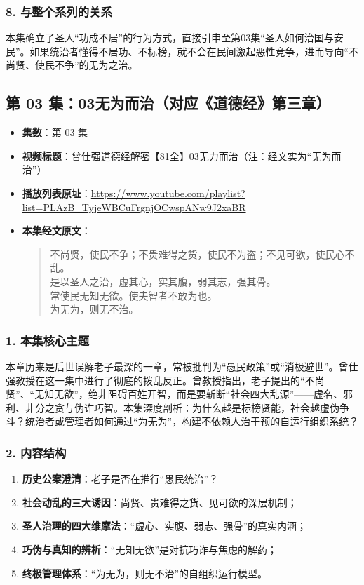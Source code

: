 \subsubsection{8. 与整个系列的关系}
本集确立了圣人“功成不居”的行为方式，直接引申至第03集“圣人如何治国与安民”。如果统治者懂得不居功、不标榜，就不会在民间激起恶性竞争，进而导向“不尚贤、使民不争”的无为之治。

\clearpage

\subsection{第 03 集：03无为而治（对应《道德经》第三章）}
\label{sec:ep03}

\begin{itemize}
    \item \textbf{集数}：第 03 集
    \item \textbf{视频标题}：曾仕强道德经解密【81全】03无力而治（注：经文实为“无为而治”）
    \item \textbf{播放列表原址}：\url{https://www.youtube.com/playlist?list=PLAzB_TyjeWBCuFrgnjOCwspANw9J2xaBR}
    \item \textbf{本集经文原文}：
    \begin{quote}\kaishu
    不尚贤，使民不争；不贵难得之货，使民不为盗；不见可欲，使民心不乱。\\
    是以圣人之治，虚其心，实其腹，弱其志，强其骨。\\
    常使民无知无欲。使夫智者不敢为也。\\
    为无为，则无不治。
    \end{quote}
\end{itemize}

\subsubsection{1. 本集核心主题}
本章历来是后世误解老子最深的一章，常被批判为“愚民政策”或“消极避世”。曾仕强教授在这一集中进行了彻底的拨乱反正。曾教授指出，老子提出的“不尚贤”、“无知无欲”，绝非阻碍百姓开智，而是要斩断“社会四大乱源”——虚名、邪利、非分之贪与伪诈巧智。本集深度剖析：为什么越是标榜贤能，社会越虚伪争斗？统治者或管理者如何通过“为无为”，构建不依赖人治干预的自运行组织系统？

\subsubsection{2. 内容结构}
\begin{enumerate}
    \item \textbf{历史公案澄清}：老子是否在推行“愚民统治”？
    \item \textbf{社会动乱的三大诱因}：尚贤、贵难得之货、见可欲的深层机制；
    \item \textbf{圣人治理的四大维摩法}：“虚心、实腹、弱志、强骨”的真实内涵；
    \item \textbf{巧伪与真知的辨析}：“无知无欲”是对抗巧诈与焦虑的解药；
    \item \textbf{终极管理体系}：“为无为，则无不治”的自组织运行模型。
\end{enumerate}


